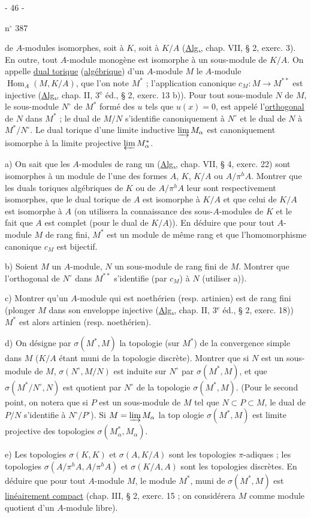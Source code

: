 \begin{center}- 46 -\end{center}
\hfill n$^\circ$ 387

de $A$-modules isomorphes, soit à $K$, soit à $K/A$ (\uline{Alg.}, chap. VII, § 2, exerc. 3). En outre, tout $A$-module monogène est isomorphe à un sous-module de $K/A$. On appelle \uline{dual torique} (\uline{algébrique}) d'un $A$-module $M$ le $A$-module $\operatorname{Hom}_A(M,K/A)$, que l'on note $M^*$ ; l'application canonique $c_M:M\longrightarrow M^{**}$ est injective (\uline{Alg.}, chap. II, 3$^{\mathrm e}$ éd., § 2, exerc. 13 b)). Pour tout sous-module $N$ de $M$, le sous-module $N^\circ$ de $M^*$ formé des $u$ tels que $u(x)=0$, est appelé l'\uline{orthogonal} de $N$ dans $M^*$ ; le dual de $M/N$ s'identifie canoniquement à $N^\circ$ et le dual de $N$ à $M^*/N^\circ$. Le dual torique d'une limite inductive $\varinjlim M_\alpha$ est canoniquement isomorphe à la limite projective $\varprojlim M_\alpha^*$.

a) On sait que les $A$-modules de rang un (\uline{Alg.}, chap. VII, § 4, exerc. 22) sont isomorphes à un module de l'une des formes $A$, $K$, $K/A$ ou $A/\pi^h A$. Montrer que les duals toriques algébriques de $K$ ou de $A/\pi^h A$ leur sont respectivement isomorphes, que le dual torique de $A$ est isomorphe à $K/A$ et que celui de $K/A$ est isomorphe à $A$ (on utilisera la connaissance des sous-$A$-modules de $K$ et le fait que $A$ est complet (pour le dual de $K/A$)). En déduire que pour tout $A$-module $M$ de rang fini, $M^*$ est un module de même rang et que l'homomorphisme canonique $c_M$ est bijectif.

b) Soient $M$ un $A$-module, $N$ un sous-module de rang fini de $M$. Montrer que l'orthogonal de $N^\circ$ dans $M^{**}$ s'identifie (par $c_M$) à $N$ (utiliser a)).

c) Montrer qu'un $A$-module qui est noethérien (resp. artinien) est de rang fini (plonger $M$ dans son enveloppe injective (\uline{Alg.}, chap. II, 3$^{\mathrm e}$ éd., § 2, exerc. 18)) $M^*$ est alors artinien (resp. noethérien).

d) On désigne par $\sigma(M^*,M)$ la topologie (sur $M^*$) de la convergence simple dans $M$ ($K/A$ étant muni de la topologie discrète). Montrer que si $N$ est un sous-module de $M$, $\sigma(N^\circ,M/N)$ est induite sur $N^\circ$ par $\sigma(M^*,M)$, et que $\sigma(M^*/N^\circ,N)$ est quotient par $N^\circ$ de la topologie $\sigma(M^*,M)$. (Pour le second point, on notera que si $P$ est un sous-module de $M$ tel que $N\subset P\subset M$, le dual de $P/N$ s'identifie à $N^\circ/P^\circ$). Si $M=\varinjlim M_\alpha$ la top ologie $\sigma(M^*,M)$ est limite projective des topologies $\sigma(M_\alpha^*,M_\alpha)$.

e) Les topologies $\sigma(K,K)$ et $\sigma(A,K/A)$ sont les topologies $\pi$-adiques ; les topologies $\sigma(A/\pi^h A,A/\pi^h A)$ et $\sigma(K/A,A)$ sont les topologies discrètes. En déduire que pour tout $A$-module $M$, le module $M^*$, muni de $\sigma(M^*,M)$ est \uline{linéairement compact} (chap. III, § 2, exerc. 15 ; on considérera $M$ comme module quotient d'un $A$-module libre).
